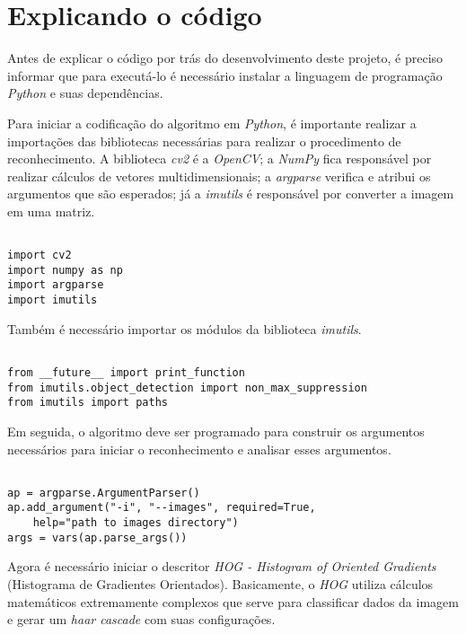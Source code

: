 \section{\textbf{Explicando o código}}
\label{explicacao-codigo}

Antes de explicar o código por trás do desenvolvimento deste projeto, é preciso informar que para executá-lo é necessário instalar a linguagem de programação \textit{Python} e suas dependências.

Para iniciar a codificação do algoritmo em \textit{Python}, é importante realizar a importações das bibliotecas necessárias para realizar o procedimento de reconhecimento. A biblioteca \textit{cv2} é a \textit{OpenCV}; a \textit{NumPy} fica responsável por realizar cálculos de vetores multidimensionais; a \textit{argparse} verifica e atribui os argumentos que são esperados; já a \textit{imutils} é responsável por converter a imagem em uma matriz.

\begin{verbatim}

import cv2
import numpy as np
import argparse
import imutils

\end{verbatim}

Também é necessário importar os módulos da biblioteca \textit{imutils}.

\begin{verbatim}

from __future__ import print_function
from imutils.object_detection import non_max_suppression
from imutils import paths

\end{verbatim}

Em seguida, o algoritmo deve ser programado para construir os argumentos necessários para iniciar o reconhecimento e analisar esses argumentos.

\begin{verbatim}

ap = argparse.ArgumentParser()
ap.add_argument("-i", "--images", required=True,
    help="path to images directory")
args = vars(ap.parse_args())

\end{verbatim}

Agora é necessário iniciar o descritor \textit{HOG - Histogram of Oriented Gradients} (Histograma de Gradientes Orientados). Basicamente, o \textit{HOG} utiliza cálculos matemáticos extremamente complexos que serve para classificar dados da imagem e gerar um \textit{haar cascade} com suas configurações.

